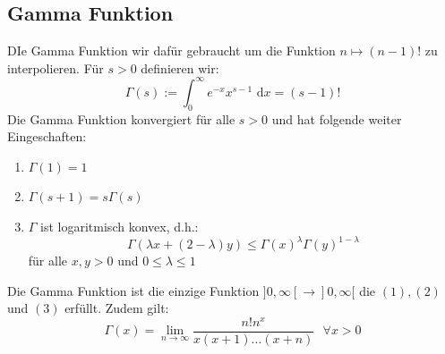 \documentclass[a4paper,8pt]{extarticle}
\def\limn{\lim_{n\to \infty}}
\def\dx{\text{ d}x}
\begin{document}
\subsection{Gamma Funktion}
DIe Gamma Funktion wir dafür gebraucht um die Funktion $n \mapsto (n-1)!$ zu interpolieren. Für $s > 0$ definieren wir: $$\Gamma(s) := \int_0^\infty e^{-x}x^{s-1}\dx = (s-1)!$$
Die Gamma Funktion konvergiert für alle $s > 0$ und hat folgende weiter Eingeschaften:
\begin{enumerate}
  \item $\Gamma(1) = 1$
  \item $\Gamma(s + 1) = s \Gamma(s)$
  \item $\Gamma$ ist logaritmisch konvex, d.h.: $$\Gamma(\lambda x + (2 - \lambda)y) \leq \Gamma(x)^\lambda \Gamma(y)^{1 - \lambda}$$ für alle $x, y > 0$ und $0 \leq \lambda \leq 1$
\end{enumerate}
Die Gamma Funktion ist die einzige Funktion $]0, \infty[ \to ]0, \infty[$ die $(1), (2)$ und $(3)$ erfüllt. Zudem gilt: $$\Gamma(x) = \limn \frac{n!n^x}{x(x+1)...(x+n)} \ \ \ \forall x > 0$$
\end{document}
